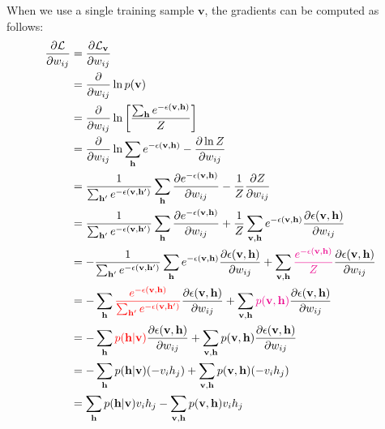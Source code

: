 \documentclass[10pt, a4paper]{article}
\begin{document}
When we use a single training sample $\mathbf{v}$, the gradients can be computed as follows:
\begin{align}
  \frac{\partial \mathcal{L}}{\partial w_{ij}} &= \dfrac{\partial \mathcal{L}_{\mathbf{v}}}{\partial w_{ij}} \nonumber \\
  &= \dfrac{\partial}{\partial w_{ij}} \ln p(\mathbf{v}) \nonumber \\
  &= \dfrac{\partial}{\partial w_{ij}} \ln \left[\dfrac{\sum_{\mathbf{h}}
        e^{-\epsilon(\mathbf{v}, \mathbf{h})}}{Z}\right] \nonumber \\
  &= \dfrac{\partial}{\partial w_{ij}} \ln \sum_{\mathbf{h}}
        e^{-\epsilon(\mathbf{v}, \mathbf{h})}
        - \dfrac{\partial  \ln Z}{\partial w_{ij}} \nonumber \\
  &= \dfrac{1}{\sum_{\mathbf{h^\prime}} e^{-\epsilon(\mathbf{v}, \mathbf{h^\prime})}}
        \sum_{\mathbf{h}} \dfrac{\partial e^{-\epsilon(\mathbf{v}, \mathbf{h})}}{\partial w_{ij}}
        - \dfrac{1}{Z} \dfrac{\partial Z}{\partial w_{ij}} \nonumber \\
  &= \dfrac{1}{\sum_{\mathbf{h^\prime}} e^{-\epsilon(\mathbf{v}, \mathbf{h^\prime})}}
        \sum_{\mathbf{h}} \dfrac{\partial e^{-\epsilon(\mathbf{v}, \mathbf{h})}}{\partial w_{ij}}
        +\dfrac{1}{Z} \sum_{\mathbf{v}, \mathbf{h}} e^{-\epsilon(\mathbf{v},\mathbf{h})}
        \dfrac{\partial \epsilon(\mathbf{v}, \mathbf{h})}{\partial w_{ij}} \nonumber \\
  &=-\dfrac{1}{\sum_{\mathbf{h^\prime}} e^{-\epsilon(\mathbf{v}, \mathbf{h^\prime})}}
        \sum_{\mathbf{h}} e^{-\epsilon(\mathbf{v}, \mathbf{h})}
        \dfrac{\partial \epsilon(\mathbf{v}, \mathbf{h})}{\partial w_{ij}}
        + \sum_{\mathbf{v}, \mathbf{h}} \textcolor{magenta}{\dfrac{e^{-\epsilon(\mathbf{v},\mathbf{h})}}{Z}}
        \dfrac{\partial \epsilon(\mathbf{v}, \mathbf{h})}{\partial w_{ij}} \nonumber \\
  &=-\sum_{\mathbf{h}} \textcolor{red}{\dfrac{e^{-\epsilon(\mathbf{v}, \mathbf{h})}}{
                      \sum_{\mathbf{h^\prime}} e^{-\epsilon(\mathbf{v}, \mathbf{h^\prime})}}}
        \dfrac{\partial \epsilon(\mathbf{v}, \mathbf{h})}{\partial w_{ij}}
        + \sum_{\mathbf{v}, \mathbf{h}} \textcolor{magenta}{p(\mathbf{v},\mathbf{h})}
        \dfrac{\partial \epsilon(\mathbf{v}, \mathbf{h})}{\partial w_{ij}} \nonumber \\
  &=-\sum_{\mathbf{h}} \textcolor{red}{p(\mathbf{h}|\mathbf{v})}
        \dfrac{\partial \epsilon(\mathbf{v}, \mathbf{h})}{\partial w_{ij}}
        + \sum_{\mathbf{v}, \mathbf{h}} p(\mathbf{v},\mathbf{h})
        \dfrac{\partial \epsilon(\mathbf{v}, \mathbf{h})}{\partial w_{ij}} \nonumber \\
  &=-\sum_{\mathbf{h}} p(\mathbf{h}|\mathbf{v}) (-v_i h_j)
        + \sum_{\mathbf{v}, \mathbf{h}} p(\mathbf{v},\mathbf{h}) (-v_i h_j) \nonumber \\
  &=\sum_{\mathbf{h}} p(\mathbf{h}|\mathbf{v}) v_i h_j
        - \sum_{\mathbf{v}, \mathbf{h}} p(\mathbf{v},\mathbf{h}) v_i h_j \label{eq:gradient_w}
\end{align}
\end{document}

